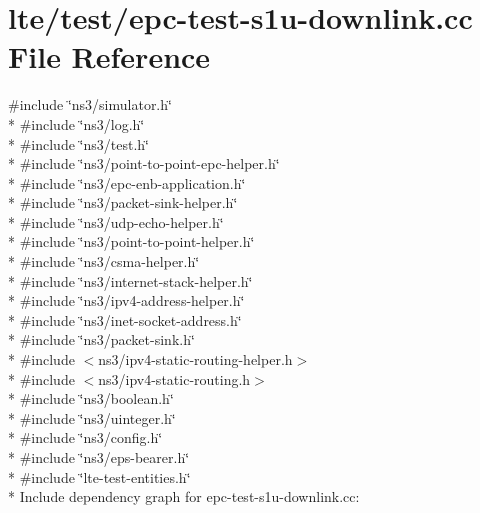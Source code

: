 \hypertarget{epc-test-s1u-downlink_8cc}{}\section{lte/test/epc-\/test-\/s1u-\/downlink.cc File Reference}
\label{epc-test-s1u-downlink_8cc}
{\ttfamily \#include \char`\"{}ns3/simulator.\+h\char`\"{}}\\*
{\ttfamily \#include \char`\"{}ns3/log.\+h\char`\"{}}\\*
{\ttfamily \#include \char`\"{}ns3/test.\+h\char`\"{}}\\*
{\ttfamily \#include \char`\"{}ns3/point-\/to-\/point-\/epc-\/helper.\+h\char`\"{}}\\*
{\ttfamily \#include \char`\"{}ns3/epc-\/enb-\/application.\+h\char`\"{}}\\*
{\ttfamily \#include \char`\"{}ns3/packet-\/sink-\/helper.\+h\char`\"{}}\\*
{\ttfamily \#include \char`\"{}ns3/udp-\/echo-\/helper.\+h\char`\"{}}\\*
{\ttfamily \#include \char`\"{}ns3/point-\/to-\/point-\/helper.\+h\char`\"{}}\\*
{\ttfamily \#include \char`\"{}ns3/csma-\/helper.\+h\char`\"{}}\\*
{\ttfamily \#include \char`\"{}ns3/internet-\/stack-\/helper.\+h\char`\"{}}\\*
{\ttfamily \#include \char`\"{}ns3/ipv4-\/address-\/helper.\+h\char`\"{}}\\*
{\ttfamily \#include \char`\"{}ns3/inet-\/socket-\/address.\+h\char`\"{}}\\*
{\ttfamily \#include \char`\"{}ns3/packet-\/sink.\+h\char`\"{}}\\*
{\ttfamily \#include $<$ns3/ipv4-\/static-\/routing-\/helper.\+h$>$}\\*
{\ttfamily \#include $<$ns3/ipv4-\/static-\/routing.\+h$>$}\\*
{\ttfamily \#include \char`\"{}ns3/boolean.\+h\char`\"{}}\\*
{\ttfamily \#include \char`\"{}ns3/uinteger.\+h\char`\"{}}\\*
{\ttfamily \#include \char`\"{}ns3/config.\+h\char`\"{}}\\*
{\ttfamily \#include \char`\"{}ns3/eps-\/bearer.\+h\char`\"{}}\\*
{\ttfamily \#include \char`\"{}lte-\/test-\/entities.\+h\char`\"{}}\\*
Include dependency graph for epc-\/test-\/s1u-\/downlink.cc\+:
